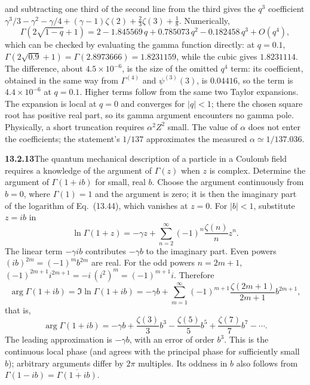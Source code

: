 and subtracting one third of the second line from the third gives the
$q^3$ coefficient
$\gamma^3/3-\gamma^2-\gamma/4+(\gamma-1)\zeta(2)+\tfrac23\zeta(3)
+\tfrac18$.  Numerically,
\[
\Gamma(2\sqrt{1-q}+1)=2-1.845569\,q+0.785073\,q^2-0.182458\,q^3
+O(q^4),
\]
which can be checked by evaluating the gamma function directly: at
$q=0.1$, $\Gamma(2\sqrt{0.9}+1)=\Gamma(2.8973666)=1.8231159$, while
the cubic gives $1.8231114$.  The difference, about
$4.5\times10^{-6}$, is the size of the omitted $q^4$ term: its
coefficient, obtained in the same way from $\Gamma^{(4)}$ and
$\psi^{(3)}(3)$, is $0.04416$, so the term is $4.4\times10^{-6}$ at
$q=0.1$.
Higher terms follow from the same two Taylor expansions.  The
expansion is local at $q=0$ and converges for $|q|<1$; there the
chosen square root has positive real part, so its gamma argument
encounters no gamma pole.  Physically, a short truncation requires
$\alpha^2Z^2$ small.  The value of $\alpha$ does not enter the
coefficients; the statement's $1/137$ approximates the measured
$\alpha\simeq1/137.036$.


\par\bigskip
\noindent\textbf{13.2.13}\quad The quantum mechanical description of a
particle in a Coulomb field requires a knowledge of the argument of
$\Gamma(z)$ when $z$ is complex. Determine the argument of $\Gamma(1+ib)$
for small, real $b$.
\solution
Choose the argument continuously from $b=0$, where $\Gamma(1)=1$
and the argument is zero; it is then the imaginary part of the
logarithm of Eq.~(13.44), which vanishes at $z=0$.  For $|b|<1$,
substitute $z=ib$ in
\[
\ln\Gamma(1+z)=-\gamma z+
\sum_{n=2}^{\infty}(-1)^n\frac{\zeta(n)}n z^n.
\]
The linear term $-\gamma ib$ contributes $-\gamma b$ to the
imaginary part.  Even powers $(ib)^{2m}=(-1)^mb^{2m}$ are real.  For
the odd powers $n=2m+1$,
$(-1)^{2m+1}i^{2m+1}=-i\,(i^2)^m=(-1)^{m+1}i$.  Therefore
\[
\arg\Gamma(1+ib)=\Im\ln\Gamma(1+ib)
=-\gamma b+\sum_{m=1}^{\infty}(-1)^{m+1}
\frac{\zeta(2m+1)}{2m+1}b^{2m+1},
\]
that is,
\[
\boxed{\arg\Gamma(1+ib)
=-\gamma b+\frac{\zeta(3)}3b^3
-\frac{\zeta(5)}5b^5+\frac{\zeta(7)}7b^7-\cdots}.
\]
The leading approximation is $-\gamma b$, with an error of order
$b^3$.  This is the continuous local phase (and agrees with the
principal phase for sufficiently small $b$); arbitrary arguments
differ by $2\pi$ multiples.  Its oddness in $b$ also follows from
$\Gamma(1-ib)=\overline{\Gamma(1+ib)}$.


